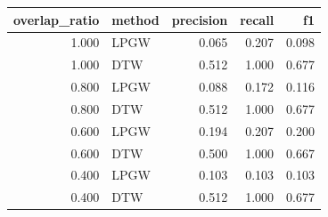 \begin{tabular}{rlrrr}
\toprule
overlap\_ratio & method & precision & recall & f1 \\
\midrule
1.000 & LPGW & 0.065 & 0.207 & 0.098 \\
1.000 & DTW & 0.512 & 1.000 & 0.677 \\
0.800 & LPGW & 0.088 & 0.172 & 0.116 \\
0.800 & DTW & 0.512 & 1.000 & 0.677 \\
0.600 & LPGW & 0.194 & 0.207 & 0.200 \\
0.600 & DTW & 0.500 & 1.000 & 0.667 \\
0.400 & LPGW & 0.103 & 0.103 & 0.103 \\
0.400 & DTW & 0.512 & 1.000 & 0.677 \\
\bottomrule
\end{tabular}
